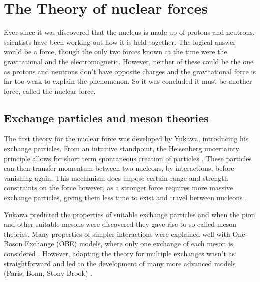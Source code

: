 \section{The Theory of nuclear forces}
Ever since it was discovered that the nucleus is made up of protons and neutrons, scientists have been working out how it is held together.
The logical answer would be a force, though the only two forces known at the time were the gravitational and the electromagnetic.
However, neither of these could be the one as protons and neutrons don't have opposite charges and the gravitational force is far too weak to explain the phenomenon.
So it was concluded it must be another force, called the nuclear force. \cite{hergert_guided_2020, machleidt_chiral_2011}


\subsection{Exchange particles and meson theories}
The first theory for the nuclear force was developed by Yukawa, introducing his exchange particles.
From an intuitive standpoint, the Heisenberg uncertainty principle allows for short term spontaneous creation of particles \cite{machleidt_nuclear_2013}.
These particles can then transfer momentum between two nucleons, by interactions, before vanishing again.
This mechanism does impose certain range and strength constraints on the force however, as a stronger force requires more massive exchange particles, giving them less time to exist and travel between nucleons \cite{machleidt_nuclear_2013, hergert_guided_2020}.

Yukawa predicted the properties of suitable exchange particles and when the pion and other suitable mesons were discovered they gave rise to so called meson theories. %
Many properties of simpler interactions were explained well with One Boson Exchange (OBE) models, where only one exchange of each meson is considered \cite{machleidt_nuclear_2013}.
However, adapting the theory for multiple exchanges wasn't as straightforward and led to the development of many more advanced models (Paris, Bonn, Stony Brook) \cite{machleidt_nuclear_2013, machleidt_meson_1989}.

